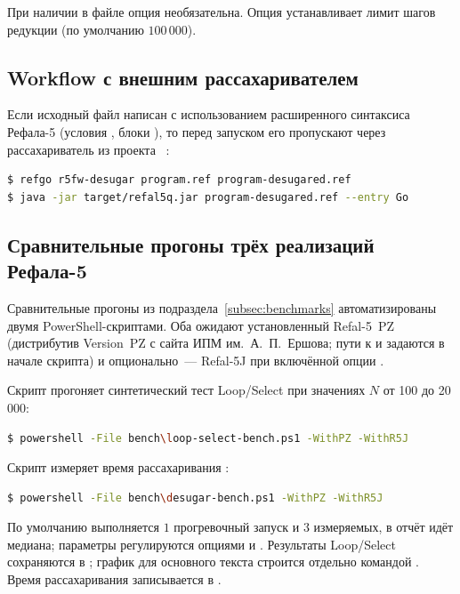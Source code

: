 При наличии  в файле опция  необязательна.
Опция  устанавливает лимит шагов редукции
(по умолчанию \(100\,000\)).

\subsection*{Workflow с внешним рассахаривателем}

Если исходный файл написан с использованием расширенного синтаксиса
Рефала-5 (условия , блоки \prog{\{ : \}}), то перед запуском
его пропускают через рассахариватель из проекта
~\cite{refal5_framework_github}:

\begin{lstlisting}[language=bash,caption={Полный workflow с рассахаривателем}]
$ refgo r5fw-desugar program.ref program-desugared.ref
$ java -jar target/refal5q.jar program-desugared.ref --entry Go
\end{lstlisting}

\subsection*{Сравнительные прогоны трёх реализаций Рефала-5}

Сравнительные прогоны из подраздела~\ref{subsec:benchmarks} автоматизированы
двумя PowerShell-скриптами. Оба ожидают установленный Refal-5~PZ~\cite{refal5_home}
(дистрибутив Version~PZ с сайта ИПМ им.~А.~П.~Ершова; пути к
 и  задаются в начале скрипта) и опционально~---
Refal-5J при включённой опции .

Скрипт  прогоняет синтетический тест
Loop/Select при значениях $N$ от 100 до 20\,000:

\begin{lstlisting}[language=bash,caption={Запуск бенчмарка Loop/Select}]
$ powershell -File bench\loop-select-bench.ps1 -WithPZ -WithR5J
\end{lstlisting}

Скрипт  измеряет время рассахаривания
:

\begin{lstlisting}[language=bash,caption={Запуск бенчмарка рассахаривателя}]
$ powershell -File bench\desugar-bench.ps1 -WithPZ -WithR5J
\end{lstlisting}

По умолчанию выполняется \(1\) прогревочный запуск и \(3\) измеряемых, в
отчёт идёт медиана; параметры регулируются опциями  и
. Результаты Loop/Select сохраняются в
; график для основного текста строится
отдельно командой .
Время рассахаривания записывается в .

